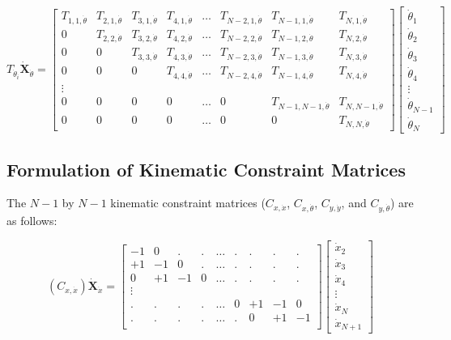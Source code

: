 \documentclass[12pt,letterpaper,titlepage]{article}
\begin{document}
\[
T_{\dot{\theta}_i}\mathbf{\dot{X}}_{\dot{\theta}} = \begin{bmatrix}
T_{1,1,\dot{\theta}}&T_{2,1,\dot{\theta}}&T_{3,1,\dot{\theta}}&T_{4,1,\dot{\theta}}&\hdots&T_{N-2,1,\dot{\theta}}&T_{N-1,1,\dot{\theta}}&T_{N,1,\dot{\theta}}\\
0&T_{2,2,\dot{\theta}}&T_{3,2,\dot{\theta}}&T_{4,2,\dot{\theta}}&\hdots&T_{N-2,2,\dot{\theta}}&T_{N-1,2,\dot{\theta}}&T_{N,2,\dot{\theta}}\\
0&0&T_{3,3,\dot{\theta}}&T_{4,3,\dot{\theta}}&\hdots&T_{N-2,3,\dot{\theta}}&T_{N-1,3,\dot{\theta}}&T_{N,3,\dot{\theta}}\\
0&0&0&T_{4,4,\dot{\theta}}&\hdots&T_{N-2,4,\dot{\theta}}&T_{N-1,4,\dot{\theta}}&T_{N,4,\dot{\theta}}\\
\vdots\\
0&0&0&0&\hdots&0&T_{N-1,N-1,\dot{\theta}}&T_{N,N-1,\dot{\theta}}\\
0&0&0&0&\hdots&0&0&T_{N,N,\dot{\theta}}
\end{bmatrix}
\begin{bmatrix}
\dot{\theta}_1\\
\dot{\theta}_2\\
\dot{\theta}_3\\
\dot{\theta}_4\\
\vdots\\
\dot{\theta}_{N-1}\\
\dot{\theta}_{N}
\end{bmatrix}
\]

\newpage

\subsection{Formulation of Kinematic Constraint Matrices}
The $N - 1$ by $N - 1$ kinematic constraint matrices ($C_{x,\dot{x}}$, $C_{x,\dot{\theta}}$, $C_{y,\dot{y}}$, and $C_{y,\dot{\theta}}$) are as follows:

\[
(C_{x,\dot{x}}) \mathbf{\dot{X}}_{\dot{x}} = \begin{bmatrix}
-1&0&.&.&\hdots&.&.&.&.\\
+1&-1&0&.&\hdots&.&.&.&.\\
0&+1&-1&0&\hdots&.&.&.&.\\
\vdots \\
.&.&.&.&\hdots&0&+1&-1&0\\
.&.&.&.&\hdots&.&0&+1&-1\\
\end{bmatrix}
\begin{bmatrix}
\dot{x}_2\\
\dot{x}_3\\
\dot{x}_4\\
\vdots\\
\dot{x}_N\\
\dot{x}_{N+1}
\end{bmatrix}
\]
\end{document}
